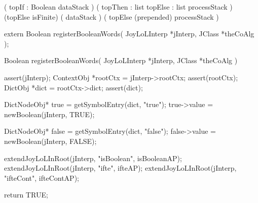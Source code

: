 \preDataStack
  (
    topIf : Boolean
    dataStack
  )
\preProcessStack
  (
    topThen : list
    topElse : list
    processStack
  )
\preConditions
  (topElse isFinite)
\postDataStack
  (
    dataStack
  )
\postProcessStack
  (
    topElse (prepended)
    processStack
  )
\postConditions
\stopRule

\stopJoyLoLWord

\startCHeader
extern Boolean registerBooleanWords(
  JoyLoLInterp *jInterp,
  JClass       *theCoAlg
);
\stopCHeader
{}

\startCCode
Boolean registerBooleanWords(
  JoyLoLInterp *jInterp,
  JClass       *theCoAlg
) {
  assert(jInterp);
  ContextObj *rootCtx = jInterp->rootCtx;
  assert(rootCtx);
  DictObj *dict = rootCtx->dict;
  assert(dict);
  
  DictNodeObj* true  = getSymbolEntry(dict, "true");
  true->value = newBoolean(jInterp, TRUE);

  DictNodeObj* false = getSymbolEntry(dict, "false");
  false->value = newBoolean(jInterp, FALSE);

  extendJoyLoLInRoot(jInterp, "isBoolean", isBooleanAP);
  extendJoyLoLInRoot(jInterp, "ifte",      ifteAP);
  extendJoyLoLInRoot(jInterp, "ifteCont",  ifteContAP);
  
  return TRUE;
}
\stopCCode
